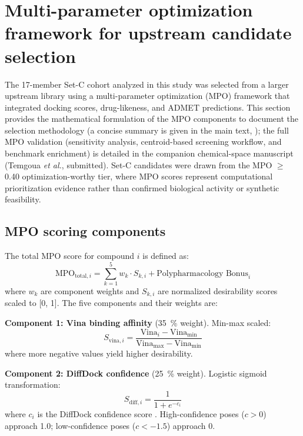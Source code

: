 \documentclass[journal=jcisd8,manuscript=suppinfo]{achemso}
\begin{document}
\section{Multi-parameter optimization framework for upstream candidate selection}\label{sec:sm_mpo}
The 17-member Set-C cohort analyzed in this study was selected from a larger upstream library using a multi-parameter optimization (MPO) framework that integrated docking scores, drug-likeness, and ADMET predictions. This section provides the mathematical formulation of the MPO components to document the selection methodology (a concise summary is given in the main text, ); the full MPO validation (sensitivity analysis, centroid-based screening workflow, and benchmark enrichment) is detailed in the companion chemical-space manuscript (Temgoua \textit{et al.}, submitted). Set-C candidates were drawn from the MPO $\geq$ \num{0.40} optimization-worthy tier, where MPO scores represent computational prioritization evidence rather than confirmed biological activity or synthetic feasibility.

\subsection{MPO scoring components}\label{sec:sm_mpo_components}
The total MPO score for compound $i$ is defined as:
\begin{equation}
\text{MPO}_{\text{total}, i} = \sum_{k=1}^{5} w_k \cdot S_{k,i} + \text{Polypharmacology Bonus}_i
\label{eq:sm_mpo_total}
\end{equation}
where $w_k$ are component weights and $S_{k,i}$ are normalized desirability scores scaled to [\num{0}, \num{1}]. The five components and their weights are:

\textbf{Component 1: Vina binding affinity} (\qty{35}{\percent} weight). Min-max scaled:
\begin{equation}
S_{\text{vina}, i} = \frac{\text{Vina}_i - \text{Vina}_{\min}}{\text{Vina}_{\max} - \text{Vina}_{\min}}
\label{eq:sm_vina}
\end{equation}
where more negative values yield higher desirability.

\textbf{Component 2: DiffDock confidence} (\qty{25}{\percent} weight). Logistic sigmoid transformation:
\begin{equation}
S_{\text{diff}, i} = \frac{1}{1 + e^{-c_i}}
\label{eq:sm_diffdock}
\end{equation}
where $c_i$ is the DiffDock confidence score \cite{Corso2023}. High-confidence poses ($c > \num{0}$) approach \num{1.0}; low-confidence poses ($c < \num{-1.5}$) approach \num{0}.
\end{document}
